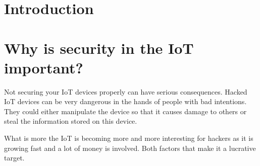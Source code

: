 \documentclass[conference]{IEEEtran}
\begin{document}






%
\IEEEpeerreviewmaketitle



\section{Introduction}
\blindtext

%
%
%

\section{Why is security in the IoT important?}
Not securing your IoT devices properly can have serious consequences. Hacked 
IoT devices can be very dangerous in the hands of people with bad intentions. 
They could either manipulate the device so that it causes damage to others or 
steal the information stored on this device. 

What is more the IoT is becoming more and more interesting for hackers as it is 
growing fast and a lot of money is involved. Both factors that make it a 
lucrative target. 
\end{document}
